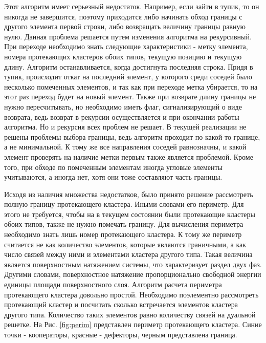 \documentclass[14pt]{article}
\begin{document}
\par Этот алгоритм имеет серьезный недостаток. Например, если зайти в тупик, то он никогда не завершится, поэтому приходится либо начинать обход границы с другого элемента первой строки, либо возвращать величину границы равную нулю. Данная проблема решается путем изменения алгоритма на рекурсивный. При переходе необходимо знать следующие характеристики - метку элемента, номера протекающих кластеров обоих типов, текущую позицию и текущую длину. Алгоритм останавливается, когда достигнута последняя строка. Придя в тупик, происходит откат на последний элемент, у которого среди соседей было несколько помеченных элементов, и так как при переходе метка убирается, то на этот раз переход будет на новый элемент. Также при возврате длину границы не нужно пересчитывать, но необходимо иметь флаг, сигнализирующий о виде возврата, ведь возврат в рекурсии осуществляется и при окончании работы алгоритма. Но и рекурсия всех проблем не решает. В текущей реализации не решены проблемы выбора границы, ведь алгоритм проходит по какой-то границе, а не минимальной. К тому же все направления соседей равнозначны, и какой элемент проверять на наличие метки первым также является проблемой. Кроме того, при обходе по помеченным элементам иногда угловые элементы учитываются, а иногда нет, хотя они тоже составляют часть границы.
\par Исходя из наличия множества недостатков, было принято решение рассмотреть полную границу протекающего кластера. Иными словами его периметр. Для этого не требуется, чтобы на в текущем состоянии были протекающие кластеры обоих типов, также не нужно помечать границу. Для вычисления периметра необходимо знать лишь номер протекающего кластера. К тому же периметр считается не как количество элементов, которые являются граничными, а как число связей между ними и элементами кластера другого типа. Такая величина является поверхностным натяжением системы, что характеризует раздел двух фаз. Другими словами, поверхностное натяжение пропорционально свободной энергии единицы площади поверхностного слоя. Алгоритм расчета периметра протекающего кластера довольно простой. Необходимо поэлементно рассмотреть протекающий кластер и посчитать сколько встречается элементов кластера другого типа. Количество таких элементов равно количеству связей на дуальной решетке. На Рис. \ref{fig:perim} представлен периметр протекающего кластера. Синие точки - кооператоры, красные - дефекторы, черным представлена граница.
\end{document}
